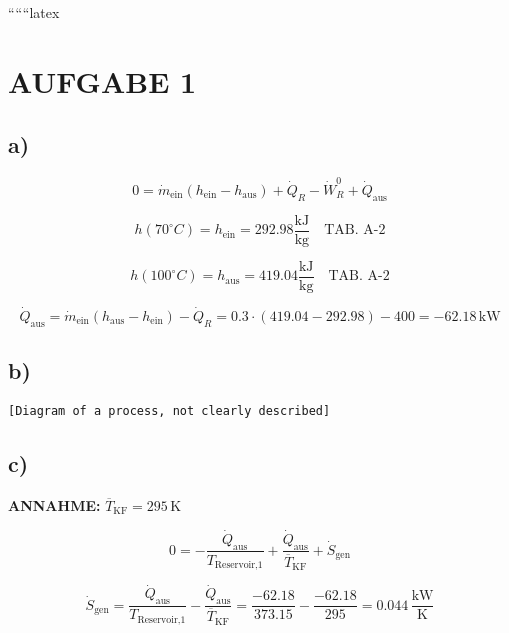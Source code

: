 
``````latex


\section*{AUFGABE 1}

\subsection*{a)}
\begin{equation*}
0 = \dot{m}_{\text{ein}} (h_{\text{ein}} - h_{\text{aus}}) + \dot{Q}_R - \dot{W}_R^0 + \dot{Q}_{\text{aus}}
\end{equation*}

\begin{equation*}
h(70^\circ C) = h_{\text{ein}} = 292.98 \frac{\text{kJ}}{\text{kg}} \quad \text{TAB. A-2}
\end{equation*}

\begin{equation*}
h(100^\circ C) = h_{\text{aus}} = 419.04 \frac{\text{kJ}}{\text{kg}} \quad \text{TAB. A-2}
\end{equation*}

\begin{equation*}
\dot{Q}_{\text{aus}} = \dot{m}_{\text{ein}} (h_{\text{aus}} - h_{\text{ein}}) - \dot{Q}_R = 0.3 \cdot (419.04 - 292.98) - 400 = -62.18 \, \text{kW}
\end{equation*}

\subsection*{b)}
\begin{verbatim}
[Diagram of a process, not clearly described]
\end{verbatim}

\subsection*{c)}
\textbf{ANNAHME:} $\overline{T}_{\text{KF}} = 295 \, \text{K}$

\begin{equation*}
0 = -\frac{\dot{Q}_{\text{aus}}}{T_{\text{Reservoir,1}}} + \frac{\dot{Q}_{\text{aus}}}{\overline{T}_{\text{KF}}} + \dot{S}_{\text{gen}}
\end{equation*}

\begin{equation*}
\dot{S}_{\text{gen}} = \frac{\dot{Q}_{\text{aus}}}{T_{\text{Reservoir,1}}} - \frac{\dot{Q}_{\text{aus}}}{\overline{T}_{\text{KF}}} = \frac{-62.18}{373.15} - \frac{-62.18}{295} = 0.044 \, \frac{\text{kW}}{\text{K}}
\end{equation*}

